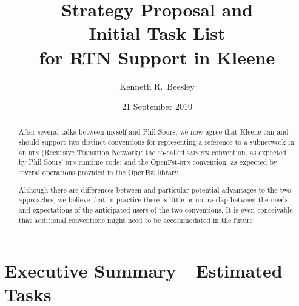 \documentclass[letterpaper,12pt]{article}
\title{Strategy Proposal and \\
Initial Task List \\
for RTN Support in Kleene}
\author{Kenneth R.~Beesley}
\date{21 September 2010}
\providecommand{\acro}{}\renewcommand{\acro}{\textsc}
\begin{document}
\maketitle


\begin{abstract}
After several talks between myself and Phil Sours, we now agree that Kleene can and
should support two distinct conventions for representing a reference to a subnetwork
in an \acro{rtn} (Recursive Transition Network): the
so-called \acro{sap-rtn} convention, as expected by Phil Sours' \acro{rtn} runtime
code; and the OpenFst-\acro{rtn} convention, as expected by several operations
provided in the OpenFst library.  

Although there are differences between and particular potential advantages to
the two approaches, we believe that in
practice there is little or no overlap between the needs and expectations of the
anticipated users of the two conventions.  It is even conceivable that
additional conventions might
need to be accommodated in the future.
\end{abstract}

\section{Executive Summary---Estimated Tasks}
\end{document}

